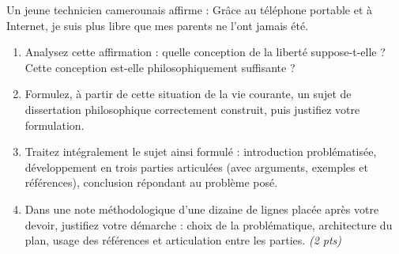 \documentclass[11pt]{article}
\begin{document}
\begin{exercice}
Un jeune technicien camerounais affirme : \og Grâce au téléphone portable et à Internet, je suis plus libre que mes parents ne l'ont jamais été. \fg
\begin{enumerate}
\item Analysez cette affirmation : quelle conception de la liberté suppose-t-elle ? Cette conception est-elle philosophiquement suffisante ?
\item Formulez, à partir de cette situation de la vie courante, un sujet de dissertation philosophique correctement construit, puis justifiez votre formulation.
\item Traitez intégralement le sujet ainsi formulé : introduction problématisée, développement en trois parties articulées (avec arguments, exemples et références), conclusion répondant au problème posé.
\item Dans une note méthodologique d'une dizaine de lignes placée après votre devoir, justifiez votre démarche : choix de la problématique, architecture du plan, usage des références et articulation entre les parties. \emph{(2 pts)}
\end{enumerate}
\end{exercice}
\end{document}
